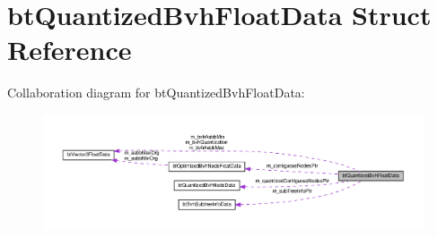 \hypertarget{structbtQuantizedBvhFloatData}{}\section{bt\+Quantized\+Bvh\+Float\+Data Struct Reference}
\label{structbtQuantizedBvhFloatData}


Collaboration diagram for bt\+Quantized\+Bvh\+Float\+Data\+:
\nopagebreak
\begin{figure}[H]
\begin{center}
\leavevmode
\includegraphics[width=350pt]{structbtQuantizedBvhFloatData__coll__graph}
\end{center}
\end{figure}

